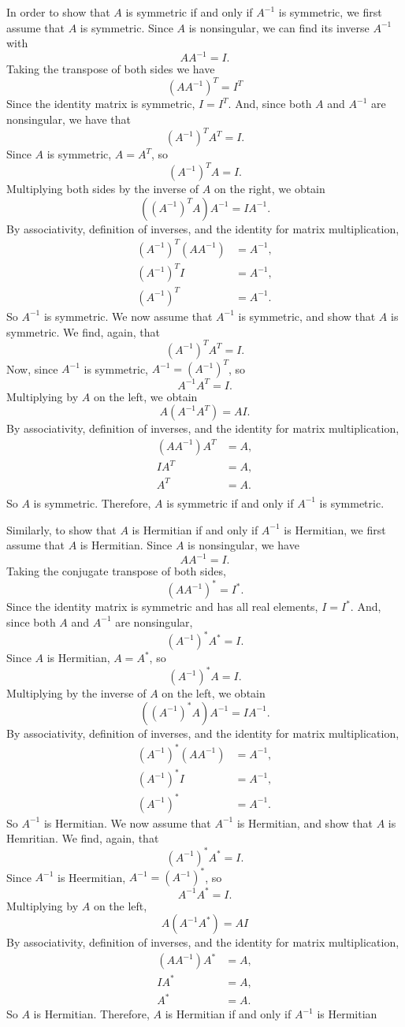 \documentclass[12pt]{article}
\begin{document}
In order to show that $A$ is symmetric if and only if $A^{-1}$ is symmetric, we first assume that $A$ is symmetric. Since $A$ is nonsingular, we can find its inverse $A^{-1}$ with
\[AA^{-1} = I.\]
Taking the transpose of both sides we have
\[(AA^{-1})^T = I^T\]
Since the identity matrix is symmetric, $I=I^T$. And, since both $A$ and $A^{-1}$ are nonsingular, we have that
\[(A^{-1})^TA^T = I.\]
Since $A$ is symmetric, $A=A^T$, so
\[(A^{-1})^TA = I.\]
Multiplying both sides by the inverse of $A$ on the right, we obtain
\[((A^{-1})^TA)A^{-1} = IA^{-1}.\]
By associativity, definition of inverses, and the identity for matrix multiplication,
\begin{align*}
    (A^{-1})^T(AA^{-1}) &= A^{-1}, \\
    (A^{-1})^TI &= A^{-1}, \\
    (A^{-1})^T &= A^{-1}.
\end{align*}
So $A^{-1}$ is symmetric. We now assume that $A^{-1}$ is symmetric, and show that $A$ is symmetric. We find, again, that
\[(A^{-1})^TA^T = I.\]
Now, since $A^{-1}$ is symmetric, $A^{-1} = (A^{-1})^T$, so
\[A^{-1}A^T = I.\]
Multiplying by $A$ on the left, we obtain
\[A(A^{-1}A^T) = AI.\]
By associativity, definition of inverses, and the identity for matrix multiplication,
\begin{align*}
    (AA^{-1})A^T &= A, \\
    IA^T &= A, \\
    A^T &= A. \\
\end{align*}
So $A$ is symmetric. Therefore, $A$ is symmetric if and only if $A^{-1}$ is symmetric.

Similarly, to show that $A$ is Hermitian if and only if $A^{-1}$ is Hermitian, we first assume that $A$ is Hermitian. Since $A$ is nonsingular, we have
\[AA^{-1} = I.\]
Taking the conjugate transpose of both sides,
\[(AA^{-1})^* = I^*.\]
Since the identity matrix is symmetric and has all real elements, $I=I^*$. And, since both $A$ and $A^{-1}$ are nonsingular,
\[(A^{-1})^*A^* = I.\]
Since $A$ is Hermitian, $A=A^*$, so
\[(A^{-1})^*A = I.\]
Multiplying by the inverse of $A$ on the left, we obtain
\[((A^{-1})^*A)A^{-1} = IA^{-1}.\]
By associativity, definition of inverses, and the identity for matrix multiplication,
\begin{align*}
    (A^{-1})^*(AA^{-1}) &= A^{-1}, \\
    (A^{-1})^*I &= A^{-1}, \\
    (A^{-1})^* &= A^{-1}.
\end{align*}
So $A^{-1}$ is Hermitian. We now assume that $A^{-1}$ is Hermitian, and show that $A$ is Hemritian. We find, again, that
\[(A^{-1})^*A^* = I.\]
Since $A^{-1}$ is Heermitian, $A^{-1} = (A^{-1})^*$, so
\[A^{-1}A^* = I.\]
Multiplying by $A$ on the left,
\[A(A^{-1}A^*) = AI\]
By associativity, definition of inverses, and the identity for matrix multiplication,
\begin{align*}
    (AA^{-1})A^* &= A, \\
    IA^* &= A, \\
    A^* &= A.
\end{align*}
So $A$ is Hermitian. Therefore, $A$ is Hermitian if and only if $A^{-1}$ is Hermitian
\end{document}
